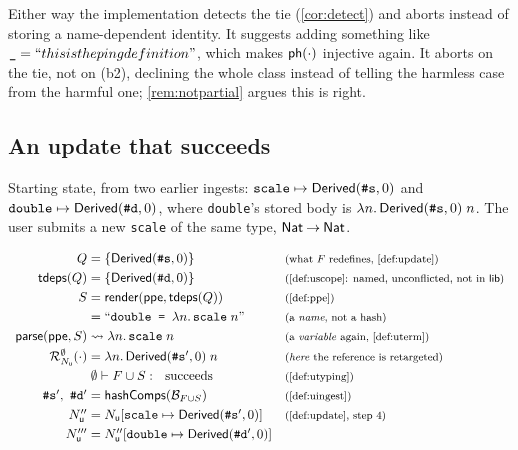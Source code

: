 \documentclass[11pt]{article}
\theoremstyle{definition}
\theoremstyle{plain}
\theoremstyle{remark}
\begin{document}
Either way the implementation detects the tie (\cref{cor:detect}) and aborts instead of storing a
name-dependent identity. It suggests adding something like
$\texttt{\_} = \text{``}this is the ping definition\text{''}$, which makes $\mathsf{ph}(\cdot)$ injective again. It
aborts on the tie, not on (b2), declining the whole class instead of telling the harmless case from
the harmful one; \cref{rem:notpartial} argues this is right.

\subsection{An update that succeeds}\label{ex:update-ok}

Starting state, from two earlier ingests:
$\texttt{scale} \mapsto \mathsf{Derived}(\texttt{\#s},0)$ and $\texttt{double} \mapsto \mathsf{Derived}(\texttt{\#d},0)$,
where \texttt{double}'s stored body is $\lambda n.\,\mathsf{Derived}(\texttt{\#s},0)\;n$. The
user submits a new \texttt{scale} of the same type, $\mathsf{Nat} \mathbin{\to} \mathsf{Nat}$.

\[
\begin{array}{r@{\;}l@{\quad}l}
  Q &= \{\UDer{\texttt{\#s}}{0}\}
    & \just{what $F$ redefines, \cref{def:update}} \\[3pt]
  \tdeps(Q) &= \{\UDer{\texttt{\#d}}{0}\}
    & \just{\cref{def:uscope}: named, unconflicted, not in $\lib$} \\[3pt]
  S &= \render(\ppe, \tdeps(Q))
    & \just{\cref{def:ppe}} \\[3pt]
  {} &= ``\texttt{double = }\ulam{n}{\uapp{\uvar{\texttt{scale}}}{\uvar n}}\text{''}
    & \just{a \emph{name}, not a hash} \\[3pt]
  \uparse(\ppe, S) &\rightsquigarrow \ulam{n}{\uapp{\uvar{\texttt{scale}}}{\uvar n}}
    & \just{a \emph{variable} again, \cref{def:uterm}} \\[3pt]
  \Res{\emptyset}{\UNames}(\cdot) &= \ulam{n}{\uapp{\uref{\UDer{\texttt{\#s}'}{0}}}{\uvar n}}
    & \just{\emph{here} the reference is retargeted} \\[3pt]
  {} &\utypes{\emptyset}{F \cup S}{\ } \text{ succeeds}
    & \just{\cref{def:utyping}} \\[3pt]
  \texttt{\#s}',\ \texttt{\#d}' &= \hashcomps(\bg_{F \cup S})
    & \just{\cref{def:uingest}} \\[3pt]
  \UNames'' &= \UNames[\texttt{scale} \mapsto \UDer{\texttt{\#s}'}{0}]
    & \just{\cref{def:update}, step 4} \\[3pt]
  \UNames''' &= \UNames''[\texttt{double} \mapsto \UDer{\texttt{\#d}'}{0}] &
\end{array}
\]
\end{document}
